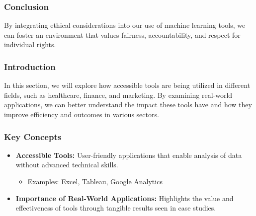 \documentclass[aspectratio=169]{beamer}
\begin{document}
\begin{frame}[fragile]
    \frametitle{Conclusion}
    By integrating ethical considerations into our use of machine learning tools, we can foster an environment that values fairness, accountability, and respect for individual rights.
\end{frame}

\begin{frame}[fragile]
    \frametitle{Introduction}
    In this section, we will explore how accessible tools are being utilized in different fields, such as healthcare, finance, and marketing. By examining real-world applications, we can better understand the impact these tools have and how they improve efficiency and outcomes in various sectors.
\end{frame}

\begin{frame}[fragile]
    \frametitle{Key Concepts}
    \begin{itemize}
        \item \textbf{Accessible Tools:} User-friendly applications that enable analysis of data without advanced technical skills.
        \begin{itemize}
            \item Examples: Excel, Tableau, Google Analytics
        \end{itemize}
        \item \textbf{Importance of Real-World Applications:} Highlights the value and effectiveness of tools through tangible results seen in case studies.
    \end{itemize}
\end{frame}
\end{document}
